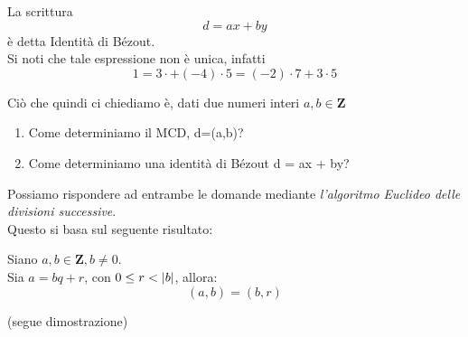 \begin{flushleft}
\begin{osservazione}
La scrittura
\[d = ax + by\]
è detta Identità di Bézout.\\
Si noti che tale espressione non è unica, infatti
\[1 = 3\cdot + (-4)\cdot 5 = (-2) \cdot 7 + 3\cdot 5\] 
\end{osservazione}

Ciò che quindi ci chiediamo è, dati due numeri interi $a,b\in \mathbf{Z}$
\begin{enumerate}
    \item Come determiniamo il MCD, d=(a,b)?
    \item Come determiniamo una identità di Bézout d = ax + by?
\end{enumerate}
Possiamo rispondere ad entrambe le domande mediante \textit{l'algoritmo Euclideo delle divisioni successive}.\\
Questo si basa sul seguente risultato:
\begin{proposizione}
Siano $a, b\in \mathbf{Z},b\neq 0$.\\
Sia $a = bq + r$, con $0\leq r < \abs{b}$, allora:
\[(a,b) = (b, r)\]
\end{proposizione}
(segue dimostrazione)\\
\vspace{150px}


\end{flushleft}
